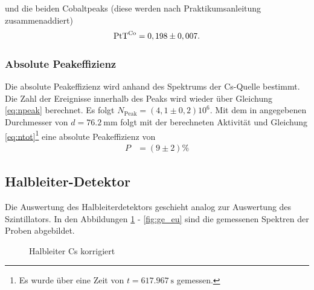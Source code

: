 und die beiden Cobaltpeaks (diese werden nach Praktikumsanleitung zusammenaddiert)
\begin{align*}
 \text{PtT}^\mathrm{Co} = 0,198\pm 0,007.
\end{align*}

\subsubsection*{Absolute Peakeffizienz}
Die absolute Peakeffizienz wird anhand des Spektrums der Cs-Quelle bestimmt. Die Zahl der Ereignisse innerhalb des Peaks wird wieder über Gleichung \ref{eq:npeak} berechnet. Es folgt $N_\mathrm{Peak}=(4,1 \pm 0,2)10^6$. Mit dem in \cite{praktikumsheft} angegebenen Durchmesser von $d=\SI{76.2}{\milli\metre}$ folgt mit der berechneten Aktivität und Gleichung \ref{eq:ntot}\footnote{Es wurde über eine Zeit von $t=\SI{617.967}{\second}$ gemessen.} eine absolute Peakeffizienz von
\begin{align*}
  P&=(9 \pm 2)\%
\end{align*}

\subsection{Halbleiter-Detektor}
Die Auswertung des Halbleiterdetektors geschieht analog zur Auswertung des Szintillators. In den Abbildungen \ref{fig:ge_cs} - \ref{fig:ge_eu} sind die gemessenen Spektren der Proben abgebildet. 

\begin{figure}[h]
\centering
{}
\caption{Halbleiter Cs korrigiert}
\label{fig:ge_cs}
\end{figure}

